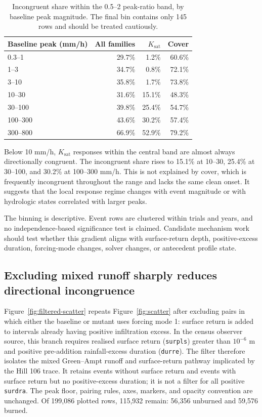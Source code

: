 \documentclass[11pt]{article}
\newcommand{\Ksat}{\ensuremath{K_{\mathrm{sat}}}}
\newcommand{\surdra}{\texttt{surdra}}
\begin{document}
\begin{table}[H]
  \centering
  \caption{Incongruent share within the 0.5--2 peak-ratio band, by baseline
  peak magnitude. The final bin contains only 145 rows and should be treated
  cautiously.}
  \label{tab:peakbins}
  \begin{tabular}{lrrr}
    \toprule
    Baseline peak (mm/h) & All families & \Ksat{} & Cover \\
    \midrule
    0.3--1 & 29.7\% & 1.2\% & 60.6\% \\
    1--3 & 34.7\% & 0.8\% & 72.1\% \\
    3--10 & 35.8\% & 1.7\% & 73.8\% \\
    10--30 & 31.6\% & 15.1\% & 48.3\% \\
    30--100 & 39.8\% & 25.4\% & 54.7\% \\
    100--300 & 43.6\% & 30.2\% & 57.4\% \\
    300--800 & 66.9\% & 52.9\% & 79.2\% \\
    \bottomrule
  \end{tabular}
\end{table}

Below 10 mm/h, \Ksat{} responses within the central
band are almost always directionally congruent. The incongruent share rises to
15.1\% at 10--30, 25.4\% at 30--100, and 30.2\% at
100--300 mm/h. This is not explained by cover,
which is frequently incongruent throughout the range and lacks the same clean
onset. It suggests that the local response regime changes with event magnitude
or with hydrologic states correlated with larger peaks.

The binning is descriptive. Event rows are clustered within trials and years,
and no independence-based significance test is claimed. Candidate mechanism
work should test whether this gradient aligns with surface-return depth,
positive-excess duration, forcing-mode changes, solver changes, or antecedent
profile state.

\subsection{Excluding mixed runoff sharply reduces directional incongruence}

Figure~\ref{fig:filtered-scatter} repeats Figure~\ref{fig:scatter} after
excluding pairs in which either the baseline or mutant uses forcing mode 1:
surface return is added to intervals already having positive infiltration
excess. In the census observer source, this branch requires realised surface
return (\texttt{surpls}) greater than $10^{-6}$ m and positive pre-addition
rainfall-excess duration (\texttt{durre}). The filter therefore isolates the
mixed Green--Ampt runoff and surface-return pathway implicated by the Hill 106
trace. It retains events without surface return and events with surface return
but no positive-excess duration; it is not a filter for all positive \surdra.
The peak floor, pairing rules, axes, markers, and opacity convention are
unchanged. Of 199,086 plotted rows, 115,932 remain: 56,356 unburned and 59,576
burned.
\end{document}
